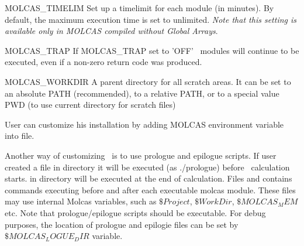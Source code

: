 \begin{variablelist}
\item[MOLCAS\_TIMELIM]
Set up a timelimit for each module (in minutes). By default, the maximum
execution time is set to unlimited. {\it Note that this setting is available only
in MOLCAS compiled without Global Arrays}.
\item[MOLCAS\_TRAP]
If MOLCAS\_TRAP set to 'OFF' \molcas\ modules will continue to be executed,
even if a non-zero return code was produced.

\item[MOLCAS\_WORKDIR]
A parent directory for all scratch areas. It can be set to an
absolute PATH (recommended), to a relative PATH, or to a special value PWD
(to use current directory for scratch files)


\end{variablelist}

User can customize his installation by adding MOLCAS environment variable into  file.

Another way of customizing \molcas\ is to use prologue and epilogue scripts. If user created a file
 in  directory it will be executed (as ./prologue) before \molcas\ calculation
starts.  in  directory will be executed at the end of calculation.
Files  and  contains commands executing before and after
each executable molcas module. These files may use internal Molcas variables, such as
$\$Project$, $\$WorkDir$, $\$MOLCAS_MEM$ etc. Note that prologue/epilogue scripts should be executable.
For debug purposes, the location of prologue and epilogie files can be set by $\$MOLCAS_LOGUE_DIR$ variable.


